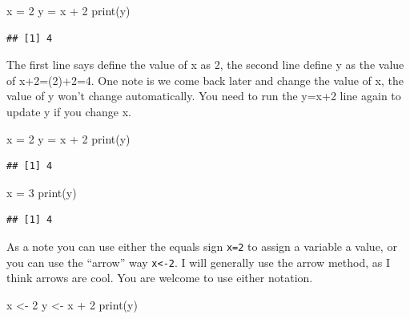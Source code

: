 \documentclass[
]{book}
\newenvironment{Shaded}{\begin{snugshade}}{\end{snugshade}}
\newcommand{\DecValTok}[1]{\textcolor[rgb]{0.00,0.00,0.81}{#1}}
\newcommand{\FunctionTok}[1]{\textcolor[rgb]{0.00,0.00,0.00}{#1}}
\newcommand{\NormalTok}[1]{#1}
\newcommand{\OtherTok}[1]{\textcolor[rgb]{0.56,0.35,0.01}{#1}}
\newcommand{\SpecialCharTok}[1]{\textcolor[rgb]{0.00,0.00,0.00}{#1}}
\theoremstyle{definition}
\theoremstyle{definition}
\theoremstyle{definition}
\theoremstyle{definition}
\theoremstyle{remark}
\begin{document}
\begin{Shaded}
\begin{Highlighting}[]
\NormalTok{x }\OtherTok{=} \DecValTok{2}
\NormalTok{y }\OtherTok{=}\NormalTok{ x }\SpecialCharTok{+} \DecValTok{2}
\FunctionTok{print}\NormalTok{(y)}
\end{Highlighting}
\end{Shaded}

\begin{verbatim}
## [1] 4
\end{verbatim}

The first line says define the value of x as 2, the second line define y as the value of x+2=(2)+2=4. One note is we come back later and change the value of x, the value of y won't change automatically. You need to run the y=x+2 line again to update y if you change x.

\begin{Shaded}
\begin{Highlighting}[]
\NormalTok{x }\OtherTok{=} \DecValTok{2}
\NormalTok{y }\OtherTok{=}\NormalTok{ x }\SpecialCharTok{+} \DecValTok{2}
\FunctionTok{print}\NormalTok{(y)}
\end{Highlighting}
\end{Shaded}

\begin{verbatim}
## [1] 4
\end{verbatim}

\begin{Shaded}
\begin{Highlighting}[]
\NormalTok{x }\OtherTok{=} \DecValTok{3}
\FunctionTok{print}\NormalTok{(y)}
\end{Highlighting}
\end{Shaded}

\begin{verbatim}
## [1] 4
\end{verbatim}

As a note you can use either the equals sign \texttt{x=2} to assign a variable a value, or you can use the ``arrow'' way \texttt{x\textless{}-2}. I will generally use the arrow method, as I think arrows are cool. You are welcome to use either notation.

\begin{Shaded}
\begin{Highlighting}[]
\NormalTok{x }\OtherTok{\textless{}{-}} \DecValTok{2}
\NormalTok{y }\OtherTok{\textless{}{-}}\NormalTok{ x }\SpecialCharTok{+} \DecValTok{2}
\FunctionTok{print}\NormalTok{(y)}
\end{Highlighting}
\end{Shaded}
\end{document}
